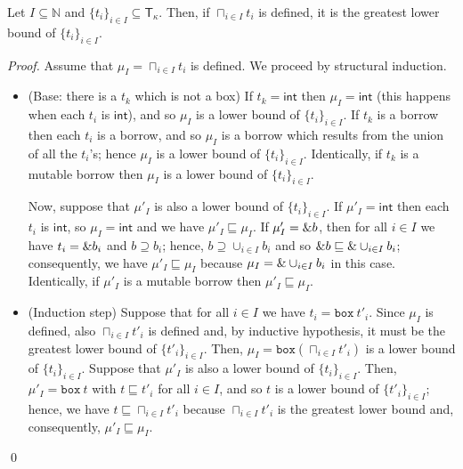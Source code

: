 \begin{lemma}\label{lemma:glb-type}
  Let $I\subseteq\mathbb{N}$ and $\{t_i\}_{i\in I}\subseteq\mathsf{T}_\kappa$.
  Then, if $\sqcap_{i\in I}t_i$ is defined, it is the greatest lower bound of $\{t_i\}_{i\in I}$.
\end{lemma}
\begin{proof}
  Assume that $\mu_I = \sqcap_{i\in I}t_i$ is defined.
  We proceed by structural induction.
  \begin{itemize}
    \item (Base: there is a $t_k$ which is not a box)
    If $t_k=\mathsf{int}$ then $\mu_I=\mathsf{int}$
    (this happens when each $t_i$ is $\mathsf{int}$), and so
    $\mu_I$ is a lower bound of $\{t_i\}_{i\in I}$.
    If $t_k$ is a borrow then each $t_i$ is a borrow, and so $\mu_I$ is
    a borrow which results from the union of all the $t_i$'s; hence
    $\mu_I$ is a lower bound of $\{t_i\}_{i\in I}$.
    Identically, if $t_k$ is a mutable borrow then $\mu_I$ is a lower bound
    of $\{t_i\}_{i\in I}$.

    Now, suppose that $\mu'_I$ is also a lower bound of $\{t_i\}_{i\in I}$.
    If $\mu'_I=\mathsf{int}$ then each $t_i$ is $\mathsf{int}$, so
    $\mu_I=\mathsf{int}$ and we have $\mu'_I\sqsubseteq\mu_I$.
    If $\mu'_I=\& b$, then for all $i\in I$ we have $t_i = \& b_i$
    and $b \supseteq b_i$; hence, $b \supseteq \cup_{i\in I}b_i$ and so
    $\& b \sqsubseteq \&\cup_{i\in I}b_i$; consequently, we have
    $\mu'_I\sqsubseteq\mu_I$ because $\mu_I=\&\cup_{i\in I}b_i$ in this case.
    Identically, if $\mu'_I$ is a mutable borrow then $\mu'_I\sqsubseteq\mu_I$.
    \item (Induction step) Suppose that for all $i\in I$ we have
    $t_i = \mathtt{box}\ t'_i$. Since $\mu_I$ is defined, also
    $\sqcap_{i\in I}t'_i$ is defined and, by inductive hypothesis, it must be the greatest
    lower bound of $\{t'_i\}_{i\in I}$. Then,
    $\mu_I = \mathtt{box}(\sqcap_{i\in I}t'_i)$ is a lower bound
    of $\{t_i\}_{i\in I}$. Suppose that $\mu'_I$ is also a lower bound
    of $\{t_i\}_{i\in I}$. Then, $\mu'_I=\mathtt{box}\ t$ with
    $t\sqsubseteq t'_i$ for all $i\in I$, and so $t$ is a lower bound
    of $\{t'_i\}_{i\in I}$; hence, we have $t\sqsubseteq \sqcap_{i\in I}t'_i$
    because $\sqcap_{i\in I}t'_i$ is the greatest lower bound and,
    consequently, $\mu'_I\sqsubseteq\mu_I$.
  \end{itemize}
  \qed
\end{proof}

